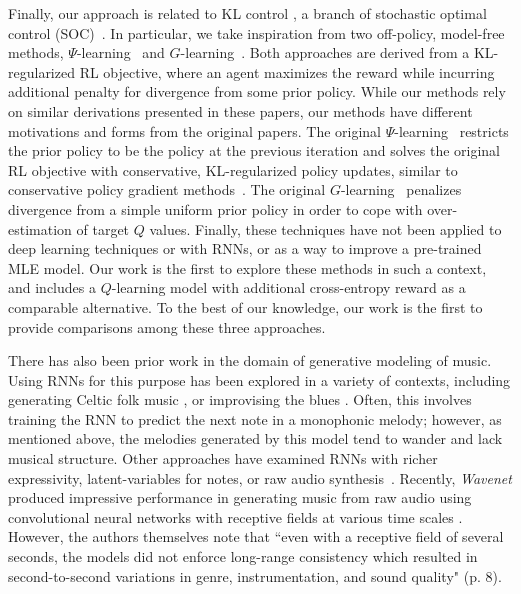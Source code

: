 Finally, our approach is related to  KL control \citep{todorov2006linearly,kappen2012optimal,rawlik2012stochastic}, a branch of stochastic optimal control (SOC)~\citep{stengel1986stochastic}. In particular, we take inspiration from two off-policy, model-free methods, $\Psi$-learning~\citep{rawlik2012stochastic} and $G$-learning~\citep{foxtaming}. Both approaches are derived from a KL-regularized RL objective, where an agent maximizes the reward while incurring additional penalty for divergence from some prior policy. While our methods rely on similar derivations presented in these papers, our methods have different motivations and forms from the original papers. The original $\Psi$-learning~\citep{rawlik2012stochastic} restricts the prior policy to be the policy at the previous iteration and solves the original RL objective with conservative, KL-regularized policy updates, similar to conservative policy gradient methods~\citep{kakade2001natural,peters2010relative,slmja-trpo-15}. The original $G$-learning~\citep{foxtaming} penalizes divergence from a simple uniform prior policy in order to cope with over-estimation of target $Q$ values. Finally, these techniques have not been applied to deep learning techniques or with RNNs, or as a way to improve a pre-trained MLE model. Our work is the first to explore these methods in such a context, and includes a $Q$-learning model with additional cross-entropy reward as a comparable alternative. To the best of our knowledge, our work is the first to provide comparisons among these three approaches.

There has also been prior work in the domain of generative modeling of music. Using RNNs for this purpose has been explored in a variety of contexts, including generating Celtic folk music \citep{sturm2016music}, or improvising the blues \citep{eck2002}. Often, this involves training the RNN to predict the next note in a monophonic melody; however, as mentioned above, the melodies generated by this model tend to wander and lack musical structure. Other approaches have examined RNNs with richer expressivity, latent-variables for notes, or raw audio synthesis~\citep{boulanger2012modeling,gu2015neural,chung2015recurrent}.  Recently, \emph{Wavenet} produced impressive performance in generating music from raw audio using convolutional neural networks with receptive fields at various time scales \citep{wavenet}. However, the authors themselves note that ``even with a receptive field of several seconds, the models did not enforce long-range consistency which resulted in second-to-second variations in genre, instrumentation, and sound quality" (p. 8).

